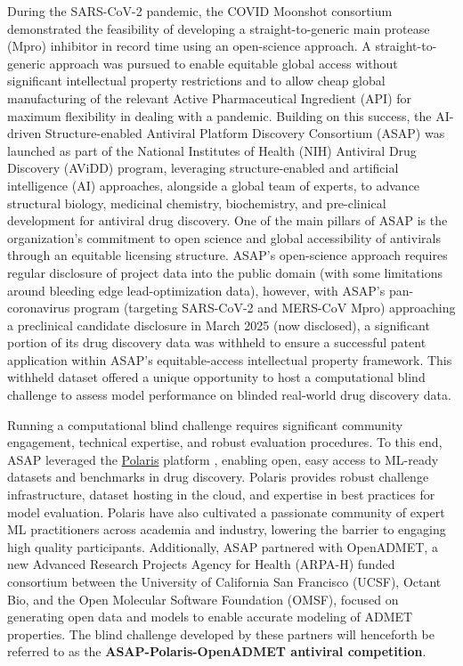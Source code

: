 \documentclass[journal=jcim,manuscript=article]{achemso}
\begin{document}
During the SARS-CoV-2 pandemic, the COVID Moonshot consortium demonstrated the feasibility of developing a straight-to-generic main protease (Mpro) inhibitor in record time using an open-science approach\cite{boby_2023}. A straight-to-generic approach was pursued to enable equitable global access without significant intellectual property restrictions and to allow cheap global manufacturing of the relevant Active Pharmaceutical Ingredient (API) for maximum flexibility in dealing with a pandemic. Building on this success, the AI-driven Structure-enabled Antiviral Platform Discovery Consortium (ASAP)\cite{ASAP_website} was launched as part of the National Institutes of Health (NIH) Antiviral Drug Discovery (AViDD) program\cite{AVIDD_niaid_2022}, leveraging structure-enabled and artificial intelligence (AI) approaches, alongside a global team of experts, to advance structural biology, medicinal chemistry, biochemistry, and pre-clinical development for antiviral drug discovery. One of the main pillars of ASAP is the organization's commitment to open science and global accessibility of antivirals through an equitable licensing structure\cite{griffen_2024}. ASAP's open-science approach requires regular disclosure of project data into the public domain (with some limitations around bleeding edge lead-optimization data), however, with ASAP's pan-coronavirus program (targeting SARS-CoV-2 and MERS-CoV Mpro\cite{sars_mers_tcp}) approaching a preclinical candidate disclosure in March 2025 (now disclosed)\cite{griffen_2025_acs}, a significant portion of its drug discovery data was withheld to ensure a successful patent application within ASAP's equitable-access intellectual property framework. This withheld dataset offered a unique opportunity to host a computational blind challenge to assess model performance on blinded real-world drug discovery data.


Running a computational blind challenge requires significant community engagement, technical expertise, and robust evaluation procedures. To this end, ASAP leveraged the \hyperlink{https://polarishub.io/}{Polaris} platform \cite{wognum_call_2024, Polaris_website, wognum_polaris-hubpolaris_2025}, enabling open, easy access to ML-ready datasets and benchmarks in drug discovery. Polaris provides robust challenge infrastructure, dataset hosting in the cloud, and expertise in best practices for model evaluation. Polaris have also cultivated a passionate community of expert ML practitioners across academia and industry, lowering the barrier to engaging high quality participants. Additionally, ASAP partnered with OpenADMET, a new Advanced Research Projects Agency for Health (ARPA-H)\cite{ARPAH_website} funded consortium between the University of California San Francisco (UCSF), Octant Bio\cite{Octant_website}, and the Open Molecular Software Foundation (OMSF)\cite{OMSF_website}, focused on generating open data and models to enable accurate modeling of ADMET properties. The blind challenge developed by these partners will henceforth be referred to as the \textbf{ASAP-Polaris-OpenADMET antiviral competition}.
\end{document}
